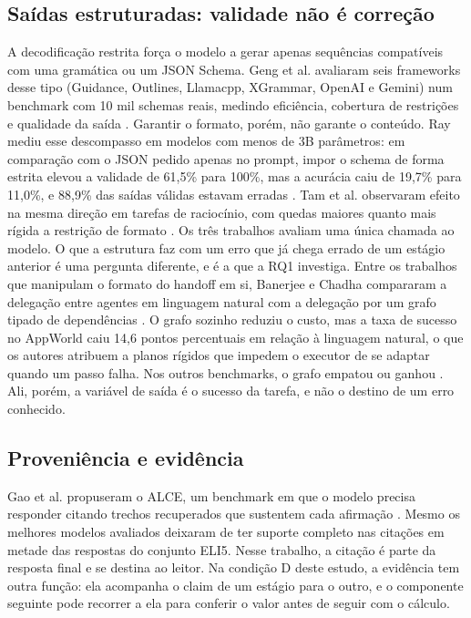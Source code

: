 \subsection{Saídas estruturadas: validade não é correção}\label{sec:rel-estruturadas}

A decodificação restrita força o modelo a gerar apenas sequências compatíveis com uma gramática ou um JSON Schema.
Geng et al. avaliaram seis frameworks desse tipo (Guidance, Outlines, Llamacpp, XGrammar, OpenAI e Gemini) num benchmark com 10 mil schemas reais, medindo eficiência, cobertura de restrições e qualidade da saída \cite{geng2025structured}.
Garantir o formato, porém, não garante o conteúdo.
Ray mediu esse descompasso em modelos com menos de 3B parâmetros: em comparação com o JSON pedido apenas no prompt, impor o schema de forma estrita elevou a validade de 61,5\% para 100\%, mas a acurácia caiu de 19,7\% para 11,0\%, e 88,9\% das saídas válidas estavam erradas \cite{ray2026constraint}.
Tam et al. observaram efeito na mesma direção em tarefas de raciocínio, com quedas maiores quanto mais rígida a restrição de formato \cite{tam2024speak}.
Os três trabalhos avaliam uma única chamada ao modelo.
O que a estrutura faz com um erro que já chega errado de um estágio anterior é uma pergunta diferente, e é a que a RQ1 investiga.
Entre os trabalhos que manipulam o formato do handoff em si, Banerjee e Chadha compararam a delegação entre agentes em linguagem natural com a delegação por um grafo tipado de dependências \cite{banerjee2026routed}.
O grafo sozinho reduziu o custo, mas a taxa de sucesso no AppWorld caiu 14,6 pontos percentuais em relação à linguagem natural, o que os autores atribuem a planos rígidos que impedem o executor de se adaptar quando um passo falha. Nos outros benchmarks, o grafo empatou ou ganhou \cite{banerjee2026routed}.
Ali, porém, a variável de saída é o sucesso da tarefa, e não o destino de um erro conhecido.

\subsection{Proveniência e evidência}\label{sec:rel-evidencia}

Gao et al. propuseram o ALCE, um benchmark em que o modelo precisa responder citando trechos recuperados que sustentem cada afirmação \cite{gao2023citations}.
Mesmo os melhores modelos avaliados deixaram de ter suporte completo nas citações em metade das respostas do conjunto ELI5.
Nesse trabalho, a citação é parte da resposta final e se destina ao leitor.
Na condição D deste estudo, a evidência tem outra função: ela acompanha o claim de um estágio para o outro, e o componente seguinte pode recorrer a ela para conferir o valor antes de seguir com o cálculo.


